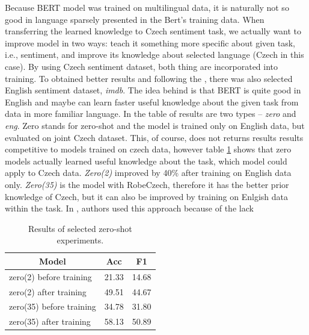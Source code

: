 \par
Because BERT model was trained on multilingual data, it is naturally not so good in language sparsely presented in the Bert's training data. When transferring the learned knowledge to Czech sentiment task, we actually want to improve model in two ways: teach it something more specific about given task, i.e., sentiment, and improve its knowledge about selected language (Czech in this case). By using Czech sentiment dataset, both thing are incorporated into training. To obtained better results and following the \citep{Putra}, there was also selected English sentiment dataset, \textit{imdb}. The idea behind is that BERT is quite good in English and maybe can learn faster useful knowledge about the given task from data in more familiar language. In the table of results are two types -- \textit{zero} and \textit{eng}. Zero stands for zero-shot and the model is trained only on English data, but evaluated on joint Czech dataset. This, of course, does not returns results results competitive to models trained on czech data, however table \ref{tab:zero} shows that zero models actually learned useful knowledge about the task, which model could apply to Czech data. \textit{Zero(2)} improved by 40\% after training on English data only. \textit{Zero(35)} is the model with RobeCzech, therefore it has the better prior knowledge of Czech, but it can also be improved by training on Enlgish data within the task. In \citep{Putra}, authors used this approach because of the lack

\begin{table}[!h]
\begin{tabular}{|l|l|l|}
\hline
\multicolumn{1}{|c|}{Model} & \multicolumn{1}{c|}{Acc} & \multicolumn{1}{c|}{F1} \\ \hline
zero(2) before training     & 21.33                    & 14.68                   \\ \hline
zero(2) after training      & 49.51                    & 44.67                   \\ \hline
zero(35) before training    & 34.78                    & 31.80                   \\ \hline
zero(35) after training     & 58.13                    & 50.89                   \\ \hline
\end{tabular}
\caption{Results of selected zero-shot experiments.}
\label{tab:zero}
\end{table}


 


















